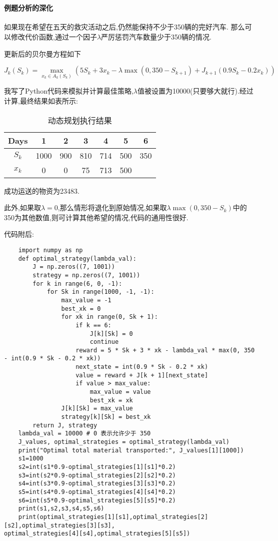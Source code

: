\documentclass[a4paper]{article}
\begin{document}
\courseheader
{}
~
\paragraph{例题分析的深化}
如果现在希望在五天的救灾活动之后,仍然能保持不少于350辆的完好汽车.
那么可以修改代价函数,通过一个因子$\lambda$严厉惩罚汽车数量少于350辆的情况.

更新后的贝尔曼方程如下

$$J_k(S_k)=\max_{x_k\in A_k(S_k)}(5S_k+3x_k-\lambda\max(0,350-S_{k+1})+J_{k+1}(0.9S_k-0.2x_k))$$

我写了Python代码来模拟并计算最佳策略,$\lambda$值被设置为10000(只要够大就行).经过计算,最终结果如表所示:

\begin{table}[h]
    \centering
    \caption{动态规划执行结果}
    \begin{tabular}{|c|c|c|c|c|c|c|}
        \hline
        \textbf{Days}  & 1    & 2   & 3   & 4   & 5   & 6   \\ \hline
        \textbf{$S_k$} & 1000 & 900 & 810 & 714 & 500 & 350 \\ \hline
        \textbf{$x_k$} & 0    & 0   & 75  & 713 & 500 &     \\ \hline
    \end{tabular}
\end{table}

成功运送的物资为23483.

此外,如果取$\lambda=0$,那么情形将退化到原始情况,如果取$\lambda\max(0,350-S_k)$中的350为其他数值,则可计算其他希望的情况,代码的通用性很好.

代码附后:

\newpage
\begin{lstlisting}
    import numpy as np
    def optimal_strategy(lambda_val):
        J = np.zeros((7, 1001))
        strategy = np.zeros((7, 1001))
        for k in range(6, 0, -1):
            for Sk in range(1000, -1, -1):  
                max_value = -1
                best_xk = 0
                for xk in range(0, Sk + 1):
                    if k == 6:
                        J[k][Sk] = 0
                        continue
                    reward = 5 * Sk + 3 * xk - lambda_val * max(0, 350 - int(0.9 * Sk - 0.2 * xk))
                    next_state = int(0.9 * Sk - 0.2 * xk)
                    value = reward + J[k + 1][next_state]
                    if value > max_value:
                        max_value = value
                        best_xk = xk
                J[k][Sk] = max_value
                strategy[k][Sk] = best_xk
        return J, strategy
    lambda_val = 10000 # 0 表示允许少于 350
    J_values, optimal_strategies = optimal_strategy(lambda_val)
    print("Optimal total material transported:", J_values[1][1000])
    s1=1000
    s2=int(s1*0.9-optimal_strategies[1][s1]*0.2)
    s3=int(s2*0.9-optimal_strategies[2][s2]*0.2)
    s4=int(s3*0.9-optimal_strategies[3][s3]*0.2)
    s5=int(s4*0.9-optimal_strategies[4][s4]*0.2)
    s6=int(s5*0.9-optimal_strategies[5][s5]*0.2)
    print(s1,s2,s3,s4,s5,s6)
    print(optimal_strategies[1][s1],optimal_strategies[2][s2],optimal_strategies[3][s3],
optimal_strategies[4][s4],optimal_strategies[5][s5])
\end{lstlisting}
\end{document}
